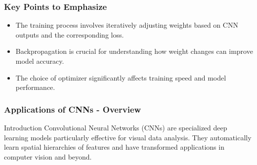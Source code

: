 \documentclass[aspectratio=169]{beamer}
\begin{document}
\begin{frame}[fragile]
    \frametitle{Key Points to Emphasize}
    \begin{itemize}
        \item The training process involves iteratively adjusting weights based on CNN outputs and the corresponding loss.
        \item Backpropagation is crucial for understanding how weight changes can improve model accuracy.
        \item The choice of optimizer significantly affects training speed and model performance.
    \end{itemize}
\end{frame}

\begin{frame}
    \frametitle{Applications of CNNs - Overview}
    \begin{block}{Introduction}
        Convolutional Neural Networks (CNNs) are specialized deep learning models particularly effective for visual data analysis. 
        They automatically learn spatial hierarchies of features and have transformed applications in computer vision and beyond.
    \end{block}
\end{frame}
\end{document}
